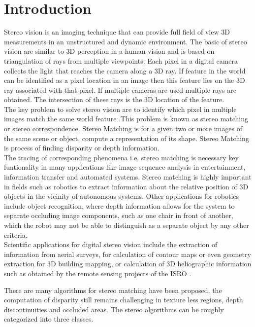 \chapter{\textbf{Introduction}}
Stereo vision is an imaging technique that can provide full field of view 3D measurements in an unstructured and dynamic environment. The basic of stereo vision are similar to 3D perception in a human vision and is based on triangulation of rays from multiple viewpoints.\cite{Ed} Each pixel in a digital camera collects the light that reaches the camera along a 3D ray. If feature in the world can be identified as a pixel location in an image then this feature lies on the 3D ray associated with that pixel. If multiple cameras are used multiple rays are obtained. The intersection of these rays is the 3D location of the feature.\\
The key problem to solve stereo vision are to identify which pixel in multiple images match the same world feature .This problem is known as stereo matching or stereo correspondence. Stereo Matching is for a given two or more images of the same scene or object, compute a representation of its shape. Stereo Matching is process of finding disparity or depth information.\cite{Mathias}\\
The tracing of corresponding phenomena i.e. stereo matching is necessary key funtionality in many applications like image sequence analysis in entertainment, information transfer and automated systems. Stereo matching is highly important in fields such as robotics to extract information about the relative position of 3D objects in the vicinity of autonomous systems. Other applications for robotics include object recognition, where depth information allows for the system to separate occluding image components, such as one chair in front of another, which the robot may not be able to distinguish as a separate object by any other criteria.\\
Scientific applications for digital stereo vision include the extraction of information from aerial surveys, for calculation of contour maps or even geometry extraction for 3D building mapping, or calculation of 3D heliographic information such as obtained by the remote sensing projects of the ISRO .

There are many algorithms for stereo matching have been proposed, the computation of disparity still remains challenging in texture less regions, depth discontinuities and occluded areas. The stereo algorithms can be roughly categorized into three classes.\cite{Mu}

